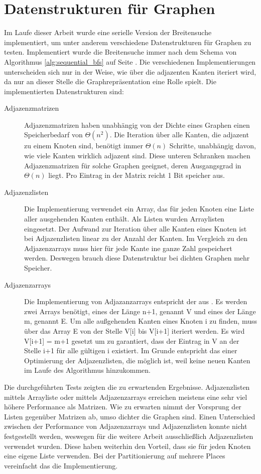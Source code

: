 \section{Datenstrukturen für Graphen} %
\label{sec:datenstrukturen_f_r_graphen}
Im Laufe dieser Arbeit wurde eine serielle Version der Breitensuche implementiert, um unter anderem verschiedene Datenstrukturen für Graphen zu testen. Implementiert wurde die Breitensuche immer nach dem Schema von Algorithmus \ref{alg:sequential_bfs} auf Seite \pageref{alg:sequential_bfs}. Die verschiedenen Implementierungen unterscheiden sich nur in der Weise, wie über die adjazenten Kanten iteriert wird, da nur an dieser Stelle die Graphrepräsentation eine Rolle spielt. Die implementierten Datenstrukturen sind:
\begin{description}
	\item [Adjazenzmatrizen] Adjazenzmatrizen haben unabhängig von der Dichte eines Graphen einen Speicherbedarf von $\Theta(n^2)$. Die Iteration über alle Kanten, die adjazent zu einem Knoten sind, benötigt immer $\Theta(n)$ Schritte, unabhängig davon, wie viele Kanten wirklich adjazent sind. Diese unteren Schranken machen Adjazenzmatrizen für solche Graphen geeignet, deren Ausgangsgrad in $\Theta(n)$ liegt. Pro Eintrag in der Matrix reicht 1 Bit speicher aus.
	\item [Adjazenzlisten] Die Implementierung verwendet ein Array, das für jeden Knoten eine Liste aller ausgehenden Kanten enthält. Als Listen wurden Arraylisten eingesetzt. Der Aufwand zur Iteration über alle Kanten eines Knoten ist bei Adjazenzlisten linear zu der Anzahl der Kanten. Im Vergleich zu den Adjazenzarrays muss hier für jede Kante ine ganze Zahl gespeichert werden. Deswegen brauch diese Datenstruktur bei dichten Graphen mehr Speicher.
	\item [Adjazenzarrays] Die Implementierung von Adjazanzarrays entspricht der aus \cite{SWB-283374373}. Es werden zwei Arrays benötigt, eines der Länge n+1, genannt V und eines der Länge m, genannt E. Um alle außgehenden Kanten eines Knoten i zu finden, muss über das Array E von der Stelle V[i] bis V[i+1] iteriert werden. Es wird V[i+1] = m+1 gesetzt um zu garantiert, dass der Eintrag in V an der Stelle i+1 für alle gültigen i existiert. Im Grunde entspricht das einer Optimierung der Adjazenzlisten, die möglich ist, weil keine neuen Kanten im Laufe des Algorithmus hinzukommen.
\end{description}

Die durchgeführten Tests zeigten die zu erwartenden Ergebnisse. Adjazenzlisten mittels Arrayliste oder mittels Adjazenzarrays erreichen meistens eine sehr viel höhere Performance als Matrizen. Wie zu erwarten nimmt der Vorsprung der Listen gegenüber Matrizen ab, umso dichter die Graphen sind. Einen Unterschied zwischen der Performance von Adjazenzarrays und Adjazenzlisten konnte nicht festgestellt werden, weswegen für die weitere Arbeit ausschließlich Adjazenzlisten verwendet wurden. Diese haben weiterhin den Vorteil, dass sie für jeden Knoten eine eigene Liste verwenden. Bei der Partitionierung auf mehrere Places vereinfacht das die Implementierung.

